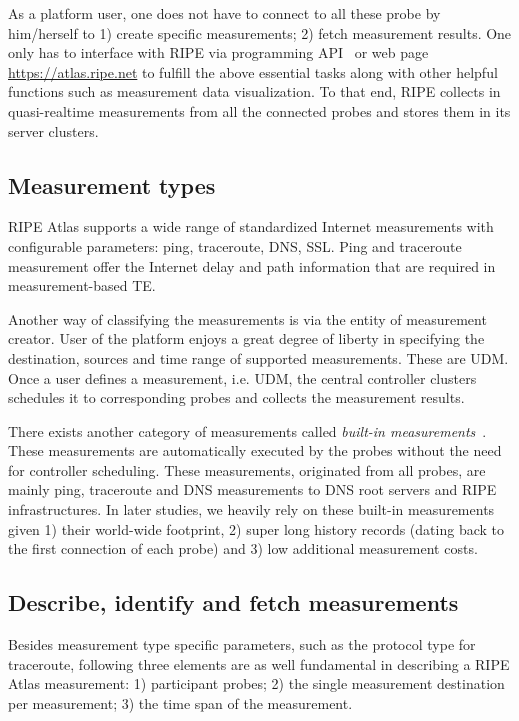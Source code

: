 As a platform user, one does not have to connect to all these probe by him/herself to 1) create specific measurements; 2) fetch measurement results. 
One only has to interface with RIPE via programming API~\cite{atlasapi} or web page \url{https://atlas.ripe.net} to fulfill the above essential tasks along with other helpful functions such as measurement data visualization.
To that end, RIPE collects in quasi-realtime measurements from all the connected probes and stores them in its server clusters.

\subsection{Measurement types}
RIPE Atlas supports a wide range of standardized Internet measurements with configurable parameters: ping, traceroute, DNS, SSL.
Ping and traceroute measurement offer the Internet delay and path information that are required in measurement-based TE.

Another way of classifying the measurements is via the entity of measurement creator. 
User of the platform enjoys a great degree of liberty in specifying the destination, sources and time range of supported measurements. 
These are \acf{UDM}. 
Once a user defines a measurement, i.e. \acf{UDM}, the central controller clusters schedules it to corresponding probes and collects the measurement results.

There exists another category of measurements called \textit{built-in measurements}~\cite{atlas}. These measurements are automatically executed by the probes without the need for controller scheduling. These measurements, originated from all probes, are mainly ping, traceroute and DNS measurements to DNS root servers and RIPE infrastructures.
In later studies, we heavily rely on these built-in measurements given 1) their world-wide footprint, 2) super long history records (dating back to the first connection of each probe) and 3) low additional measurement costs.

\subsection{Describe, identify and fetch measurements}
Besides measurement type specific parameters, such as the protocol type for traceroute, following three elements are as well fundamental in describing a RIPE Atlas measurement: 1) participant probes; 2) the single measurement destination per measurement; 3) the time span of the measurement. 

